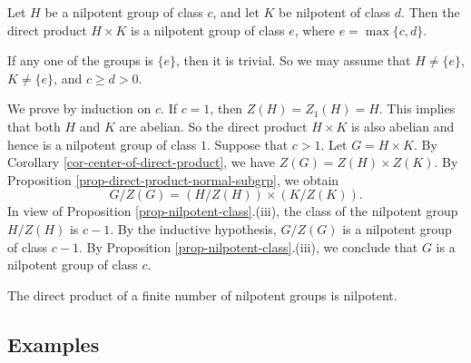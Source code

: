 \begin{proposition}
	Let $H$ be a nilpotent group of class $c$, and let $K$ be nilpotent of class $d$. Then the direct product $H \times K$ is a nilpotent group of class $e$, where $e = \max\{c, d\}$.
\end{proposition}
\begin{sketch}
	If any one of the groups is $\{e\}$, then it is trivial. So
	we may assume that $H \neq \{e\}$, $K \neq \{e\}$, and $c \ge d > 0$. 
	
	We prove by induction on $c$. If $c=1$, then $Z(H) = Z_1(H) = H$. This implies that both $H$ and $K$ are abelian. So the direct product $H \times K$ is also abelian and hence  is a nilpotent group of class $1$.  Suppose that $c > 1$. Let $G = H \times K$. By Corollary \ref{cor-center-of-direct-product}, we have $Z(G) = Z(H) \times Z(K)$. By Proposition \ref{prop-direct-product-normal-subgrp}, we obtain 
	\begin{equation*}
		G/Z(G) = (H/Z(H)) \times (K/Z(K)).
	\end{equation*}
	In view of Proposition \ref{prop-nilpotent-class}.(iii), the class of the nilpotent group $H/Z(H)$ is $c-1$. By the inductive hypothesis, $G/Z(G)$ is a nilpotent group of class $c-1$. By Proposition \ref{prop-nilpotent-class}.(iii), we conclude that $G$ is a nilpotent group of class $c$.
\end{sketch}
\begin{corollary} \label{cor-direct-prod-nil-is-nil}
	The direct product of a finite number of nilpotent groups is nilpotent.
\end{corollary}

\subsection{Examples}
